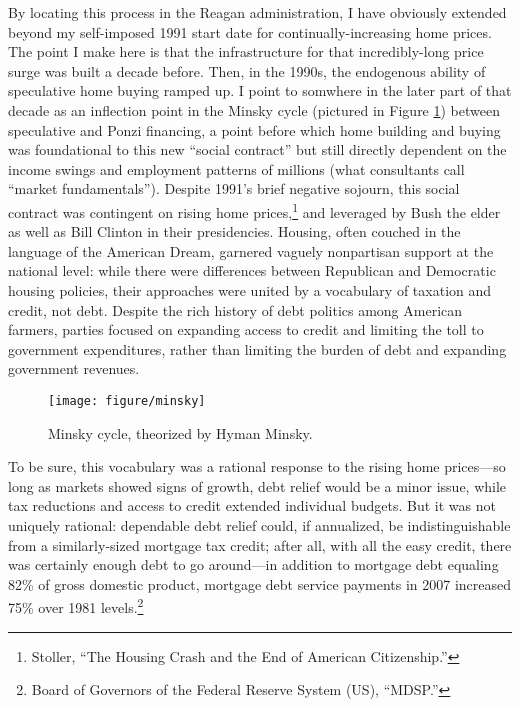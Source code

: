 \documentclass[
]{article}
\begin{document}
By locating this process in the Reagan administration, I have obviously extended beyond my self-imposed 1991 start date for continually-increasing home prices.
The point I make here is that the infrastructure for that incredibly-long price surge was built a decade before.
Then, in the 1990s, the endogenous ability of speculative home buying ramped up.
I point to somwhere in the later part of that decade as an inflection point in the Minsky cycle (pictured in Figure \ref{fig:minsky}) between speculative and Ponzi financing, a point before which home building and buying was foundational to this new ``social contract'' but still directly dependent on the income swings and employment patterns of millions (what consultants call ``market fundamentals'').
Despite 1991's brief negative sojourn, this social contract was contingent on rising home prices,\footnote{Stoller, ``The Housing Crash and the End of American Citizenship.''} and leveraged by Bush the elder as well as Bill Clinton in their presidencies.
Housing, often couched in the language of the American Dream, garnered vaguely nonpartisan support at the national level: while there were differences between Republican and Democratic housing policies, their approaches were united by a vocabulary of taxation and credit, not debt.
Despite the rich history of debt politics among American farmers, parties focused on expanding access to credit and limiting the toll to government expenditures, rather than limiting the burden of debt and expanding government revenues.

\begin{figure}

{\centering \texttt{[image: figure/minsky]}

}

\caption{Minsky cycle, theorized by Hyman Minsky.}\label{fig:minsky}
\end{figure}

To be sure, this vocabulary was a rational response to the rising home prices---so long as markets showed signs of growth, debt relief would be a minor issue, while tax reductions and access to credit extended individual budgets.
But it was not uniquely rational: dependable debt relief could, if annualized, be indistinguishable from a similarly-sized mortgage tax credit; after all, with all the easy credit, there was certainly enough debt to go around---in addition to mortgage debt equaling 82\% of gross domestic product, mortgage debt service payments in 2007 increased 75\% over 1981 levels.\footnote{Board of Governors of the Federal Reserve System (US), ``MDSP.''}
\end{document}
